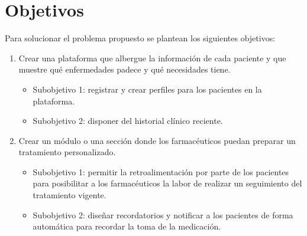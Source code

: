 \section{Objetivos}
Para solucionar el problema propuesto se plantean los siguientes objetivos:

\begin{enumerate}
	\item Crear una plataforma que albergue la información de cada paciente y que muestre qué enfermedades padece y qué necesidades tiene.
	\begin{itemize}
		\item Subobjetivo 1: registrar y crear perfiles para los pacientes en la plataforma.
		
		\item Subobjetivo 2: disponer del historial clínico reciente.
	\end{itemize}
	
	\item Crear un módulo o una sección donde los farmacéuticos puedan preparar un tratamiento personalizado.
	\begin{itemize}
		\item Subobjetivo 1: permitir la retroalimentación por parte de los pacientes para posibilitar a los farmacéuticos la labor de realizar un seguimiento del tratamiento vigente.
		
		\item Subobjetivo 2: diseñar recordatorios y notificar a los pacientes de forma automática para recordar la toma de la medicación.
		
	\end{itemize}
	
\end{enumerate}
